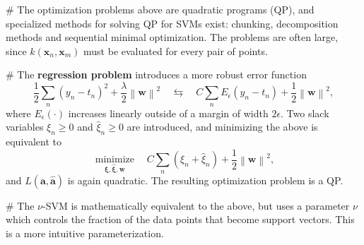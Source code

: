 \documentclass[12pt, a4paper]{article}
\newcommand{\vect}[1]{\bm{#1}}
\newcommand{\norm}[1]{\left\lVert#1\right\rVert}
\begin{document}
\begin{easylist}[itemize]
	# The optimization problems above are quadratic programs (QP), and specialized methods for solving QP for SVMs exist: chunking, decomposition methods and sequential minimal optimization.
	The problems are often large, since $k(\vect{x}_n, \vect{x}_m)$ must be evaluated for every pair of points.
	
	# The \textbf{regression problem} introduces a more robust error function
	\begin{equation*}
		\frac{1}{2} \sum_n (y_n - t_n)^2 + \frac{\lambda}{2} \norm{\vect{w}}^2
		\quad 
		\leftrightarrows
		\quad
		C \sum_n E_\epsilon \left( y_n - t_n \right) + \frac{1}{2} \norm{\vect{w}}^2,
	\end{equation*}
	where $E_\epsilon(\cdot)$ increases linearly outside of a margin of width $2\epsilon$.
	Two slack variables $\xi_n \geq 0$ and $\widehat{\xi}_n \geq 0$ are introduced, and minimizing the above is equivalent to
	\begin{equation*}
	 \underset{\vect{\xi}, \vect{\widehat{\xi}}, \vect{w}}{\operatorname{minimize}} \quad 
	C \sum_n (\xi_n + \widehat{\xi}_n) + \frac{1}{2} \norm{\vect{w}}^2,
	\end{equation*}
	 and $\widehat{L}(\vect{a}, \widehat{\vect{a}})$ is again quadratic.
	 The resulting optimization problem is a QP.
	 
	 # The $\nu$-SVM is mathematically equivalent to the above, but uses a parameter $\nu$ which controls the fraction of the data points that become support vectors.
	 This is a more intuitive parameterization.
\end{easylist}
\end{document}
